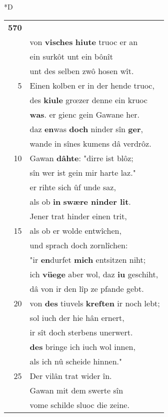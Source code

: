 \documentclass[8pt,a4paper,notitlepage]{article}
\begin{document}
\begin{table}[ht]
\begin{minipage}[t]{0.5\linewidth}
\small
\begin{center}*D
\end{center}
\begin{tabular}{rl}
\textbf{570} & \textbf{\begin{large}D\end{large}er} was \textbf{vreissam} getân.\\ 
 & von \textbf{visches} \textbf{hiute} truoc er an\\ 
 & ein surkôt unt ein bônît\\ 
 & unt des selben zwô hosen wît.\\ 
5 & Einen kolben er in der hende truoc,\\ 
 & des \textbf{kiule} grœzer denne ein kruoc\\ 
 & \textbf{was}. er gienc gein Gawane her.\\ 
 & daz \textbf{en}was \textbf{doch} ninder sîn \textbf{ger},\\ 
 & wande in sînes kumens dâ verdrôz.\\ 
10 & Gawan \textbf{dâhte}: "dirre ist blôz;\\ 
 & sîn wer ist gein mir harte laz."\\ 
 & er rihte sich ûf unde saz,\\ 
 & als ob \textbf{in} \textbf{swære ninder lit}.\\ 
 & Jener trat hinder einen trit,\\ 
15 & als ob er wolde entwîchen,\\ 
 & und sprach doch zornlîchen:\\ 
 & "ir \textbf{en}durfet \textbf{mich} entsitzen niht;\\ 
 & ich \textbf{vüege} aber wol, daz \textbf{iu} geschiht,\\ 
 & dâ von ir den lîp ze pfande gebt.\\ 
20 & von \textbf{des} tiuvels \textbf{kreften} ir noch lebt;\\ 
 & sol iuch der hie hân ernert,\\ 
 & ir sît doch sterbens unerwert.\\ 
 & \textbf{des} bringe ich iuch wol innen,\\ 
 & als ich nû scheide hinnen."\\ 
25 & Der vilân trat wider în.\\ 
 & Gawan mit dem swerte sîn\\ 
 & vome schilde sluoc die zeine.\\ 

\end{tabular}
\end{minipage}
\end{table}
\end{document}
